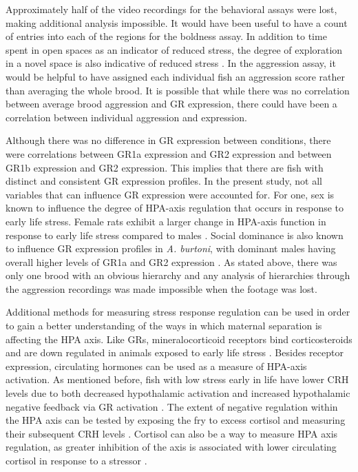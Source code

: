 \documentclass[12pt,twoside]{reedthesis}
\begin{document}
Approximately half of the video recordings for the behavioral assays
were lost, making additional analysis impossible. It would have been useful to
have a count of entries into each of the regions for the boldness assay. In
addition to time spent in open spaces as an indicator of reduced
stress, the degree of exploration in a novel space is also indicative of
reduced stress \citep{bannier_early_2017}. In the aggression assay, it would be helpful to have assigned
each individual fish an aggression score rather than averaging the whole brood.
It is possible that while there was no correlation between average brood
aggression and GR expression, there could have been a correlation between
individual aggression and expression. 

Although there was no difference in GR expression between conditions, there were
correlations between GR1a expression and GR2 expression and between GR1b
expression and GR2 expression. This implies that there are fish with distinct
and consistent GR expression profiles. In the present study, not all variables that can influence GR expression were
accounted for. For one, sex is known to influence the degree of HPA-axis
regulation that occurs in response to early life stress. Female rats exhibit a
larger change in HPA-axis function in response to early life stress compared to males \citep{mccormick_sex-specific_1995}. Social dominance is also known to influence
GR expression profiles in \textit{A. burtoni}, with dominant
males having overall higher levels of GR1a and GR2 expression
\citep{korzan_social_2014}. As stated above, there was only one brood with an
obvious hierarchy and any analysis of hierarchies through the aggression
recordings was made impossible when the footage was lost.

Additional methods for measuring stress response regulation can be used in order
to gain a better understanding of the ways in which maternal separation is
affecting the HPA axis. Like GRs, mineralocorticoid receptors bind
corticosteroids and are
down regulated in animals exposed to early life stress \citep{gass_mice_2001, meaney_early_1996}.
Besides receptor expression, circulating hormones can be used
as a measure of HPA-axis activation. As mentioned
before, fish with low stress early in life have lower CRH levels due to both
decreased hypothalamic activation and increased hypothalamic negative feedback via
GR activation \citep{taborsky_stable_2012}. The extent of negative regulation
within the HPA axis can be tested by exposing the fry to excess cortisol and
measuring their subsequent CRH levels \citep{liu_maternal_2000}. Cortisol can also be a way to measure HPA
axis regulation, as greater inhibition of the axis is associated with lower
circulating cortisol in response to a stressor \citep{liu_maternal_2000}.
\end{document}
